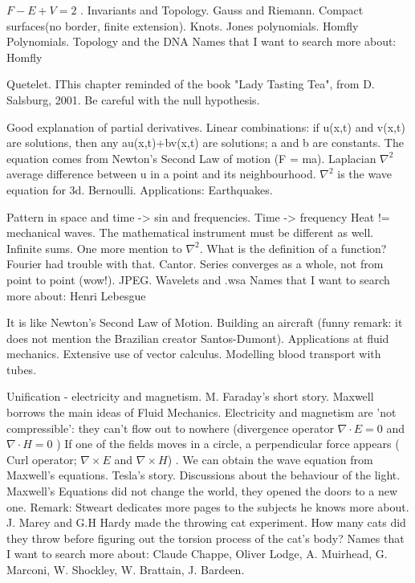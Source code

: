\documentclass{cornell}
\begin{document}
%
{ \( F-E+V=2 \) . Invariants and Topology. Gauss and Riemann. Compact surfaces(no border, finite extension). Knots. Jones polynomials. Homfly Polynomials. Topology and the DNA}%
{Names that I want to search more about: Homfly}%

%
{Quetelet. IThis chapter reminded of the book "Lady Tasting Tea", from D. Salsburg, 2001. Be careful with the null hypothesis.}%


%
{Good explanation of partial derivatives. Linear combinations: if u(x,t) and v(x,t) are solutions, then any au(x,t)+bv(x,t) are solutions; a and b are constants.}%
{The equation comes from Newton's Second Law of motion (F = ma). Laplacian \( \nabla^2 \) average difference between u in a point and its neighbourhood. \( \nabla^2 \) is the wave equation for 3d. Bernoulli. Applications: Earthquakes.}%

%
{Pattern in space and time -> sin and frequencies. Time -> frequency Heat != mechanical waves. The mathematical instrument must be different as well. Infinite sums. One more mention to \( \nabla^2 \). What is the definition of a function? Fourier had trouble with that. Cantor. Series converges as a whole, not from point to point (wow!). JPEG. Wavelets and .wsa}%
{Names that I want to search more about: Henri Lebesgue}%

%
{It is like Newton's Second Law of Motion. Building an aircraft (funny remark: it does not mention the Brazilian creator Santos-Dumont). Applications at fluid mechanics. Extensive use of vector calculus. Modelling blood transport with tubes. }%

%
{Unification - electricity and magnetism. M. Faraday's short story. Maxwell borrows the main ideas of Fluid Mechanics. Electricity and magnetism are 'not compressible': they can't flow out to nowhere (divergence operator \( \nabla \cdot E = 0\) and \( \nabla \cdot H = 0 \) ) If one of the fields moves in a circle, a perpendicular force appears ( Curl operator; \( \nabla \times E \) and \( \nabla \times H \)) . }%
{We can obtain the wave equation from Maxwell's equations. Tesla's story. Discussions about the behaviour of the light. Maxwell's Equations did not change the world, they opened the doors to a new one.}%
{Remark: Stweart dedicates more pages to the subjects he knows more about. J. Marey and G.H Hardy made the throwing cat experiment. How many cats did they throw before figuring out the torsion process of the cat's body? }%
{Names that I want to search more about: Claude Chappe, Oliver Lodge, A. Muirhead, G. Marconi, W. Shockley, W. Brattain, J. Bardeen.}%
\end{document}

